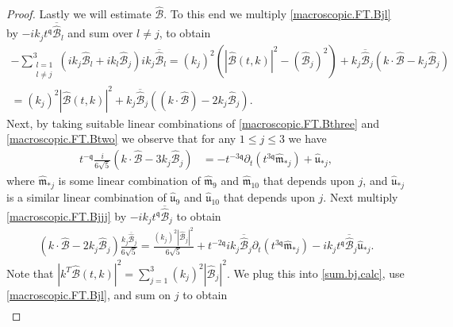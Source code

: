 \documentclass[10pt,a4paper]{amsart}
\newcommand{\qq}{\mathfrak{q}}
\newcommand{\tTq}{t^{3\qq}}
\newcommand{\tmTq}{t^{-3\qq}}
\newcommand{\tmq}{t^{-\qq}}
\newcommand{\tq}{t^{\qq}}
\begin{document}
\begin{proof}
Lastly we will estimate $\widehat{\mathcal{B}}$.  To this end we multiply \eqref{macroscopic.FT.Bjl} by $-ik_j \tq \overline{\widehat{\mathcal{B}}}_l$ and sum over $l\neq j$, to obtain
\begin{multline}
        -\sum_{\substack{l=1 \\ l\neq j}}^3 \left(ik_j \widehat{\mathcal{B}}_l+ik_l \widehat{\mathcal{B}}_j \right)ik_j \overline{\widehat{\mathcal{B}}}_l
    = (k_j)^2 \left(|\widehat{\mathcal{B}}(t,k)|^2 
    -
    ( \widehat{\mathcal{B}}_j )^2\right) 
    + 
     k_j \overline{\widehat{\mathcal{B}}}_j\left( k \cdot \widehat{\mathcal{B}} -k_j \widehat{\mathcal{B}}_j\right)
    \\  \label{sum.bj.calc}
     = (k_j)^2 |\widehat{\mathcal{B}}(t,k)|^2 
    + 
     k_j \overline{\widehat{\mathcal{B}}}_j\left(\left( k \cdot \widehat{\mathcal{B}} \right)
        -
2   k_j   \widehat{\mathcal{B}}_j  \right).
\end{multline}
Next, by taking suitable linear combinations of \eqref{macroscopic.FT.Bthree} and \eqref{macroscopic.FT.Btwo} we observe that for any $1\leq j\leq 3$ we have 
\begin{align}\label{macroscopic.FT.Bjjj}
    \tmq\frac{i}{6\sqrt{5}}\left( k\cdot \widehat{\mathcal{B}}-3k_j \widehat{\mathcal{B}}_j\right)
&=-\tmTq  \partial_t\left( \tTq \widehat{\mathfrak{m}}_{*j} \right)+\widehat{\mathfrak{u}}_{*j},
\end{align}
where $\widehat{\mathfrak{m}}_{*j}$ is some linear combination of  $\widehat{\mathfrak{m}}_{9}$ and $\widehat{\mathfrak{m}}_{10}$ that depends upon $j$, and  $\widehat{\mathfrak{u}}_{*j}$ is a similar linear combination of $\widehat{\mathfrak{u}}_{9}$ and $\widehat{\mathfrak{u}}_{10}$ that depends upon $j$.  Next multiply \eqref{macroscopic.FT.Bjjj} by $-ik_j \tq \overline{\widehat{\mathcal{B}}}_j$ to obtain 
\begin{align*}
    \left( k\cdot \widehat{\mathcal{B}}-2k_j \widehat{\mathcal{B}}_j\right)
    \frac{k_j \overline{\widehat{\mathcal{B}}}_j}{6\sqrt{5}}
= \frac{(k_j)^2 |\widehat{\mathcal{B}}_j|^2}{6\sqrt{5}}
+
t^{-2\qq}  ik_j\overline{\widehat{\mathcal{B}}}_j\partial_t\left( \tTq \widehat{\mathfrak{m}}_{*j} \right)
-
ik_j \tq\overline{\widehat{\mathcal{B}}}_j\widehat{\mathfrak{u}}_{*j}.
\end{align*}
Note that $|k^T\widehat{\mathcal{B}}(t,k)|^2 = \sum_{j=1}^3(k_j)^2 |\widehat{\mathcal{B}}_j|^2$.  
We plug this into \eqref{sum.bj.calc}, use \eqref{macroscopic.FT.Bjl}, and sum on $j$ to obtain 
\begin{multline*}

\end{multline*}
\end{proof}
\end{document}
